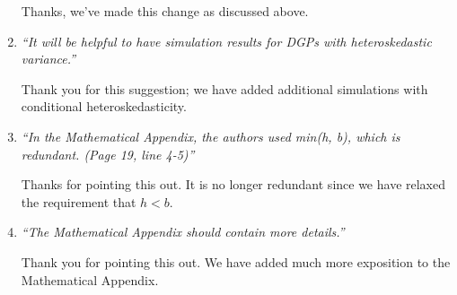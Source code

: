 \documentclass[12pt,fleqn]{article}
\begin{document}
\begin{enumerate}
Thanks, we've made this change as discussed above.

\item \textit{``It will be helpful to have simulation results for DGPs with heteroskedastic variance.''}

  Thank you for this suggestion; we have added additional simulations with conditional heteroskedasticity.

\item \textit{``In the Mathematical Appendix, the authors used min(h, b), which is redundant. (Page 19, line 4-5)''}

Thanks for pointing this out. It is no longer redundant since we have relaxed
the requirement that $h < b$.

\item \textit{``The Mathematical Appendix should contain more details.''}

Thank you for pointing this out. We have added much more exposition to the
Mathematical Appendix.

\end{enumerate}
\end{document}
